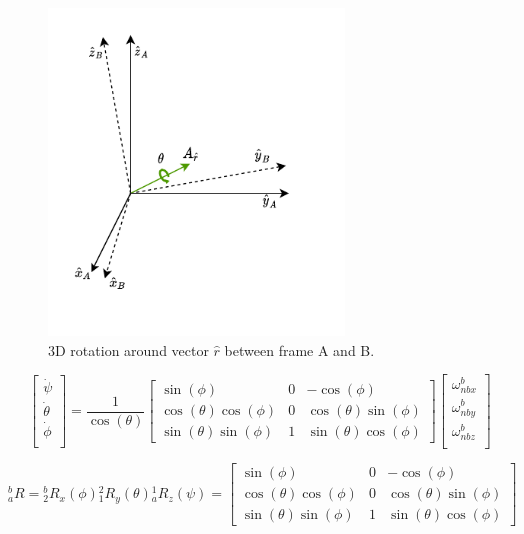 \begin{figure}[!h]
  \centering
  \includegraphics[width=0.7\textwidth]{figures/rotation.pdf}
  \caption{ 3D rotation around vector $\hat{r}$ between frame A and B. }
  \label{fig:rotation}
\end{figure}

\begin{equation}
  \begin{bmatrix}
    \dot{\psi}   \\
    \dot{\theta} \\
    \dot{\phi}   \\
  \end{bmatrix}
  =
  \frac{1}{\cos(\theta)}
  \begin{bmatrix}
    \sin(\phi)             & 0 & -\cos(\phi)            \\
    \cos(\theta)\cos(\phi) & 0 & \cos(\theta)\sin(\phi) \\
    \sin(\theta)\sin(\phi) & 1 & \sin(\theta)\cos(\phi)
  \end{bmatrix}
  \begin{bmatrix}
    \omega{^b_{nbx}} \\
    \omega{^b_{nby}} \\
    \omega{^b_{nbz}} \\
  \end{bmatrix}
  \label{eq:euler_equation}
\end{equation}

\begin{equation}
  {^b_a}R = {^b_2}R_x(\phi){^2_1}R_y(\theta){^1_a}R_z(\psi)
  =
  \begin{bmatrix}
    \sin(\phi)             & 0 & -\cos(\phi)            \\
    \cos(\theta)\cos(\phi) & 0 & \cos(\theta)\sin(\phi) \\
    \sin(\theta)\sin(\phi) & 1 & \sin(\theta)\cos(\phi)
  \end{bmatrix}
  \label{eq:euler_equations}
\end{equation}

